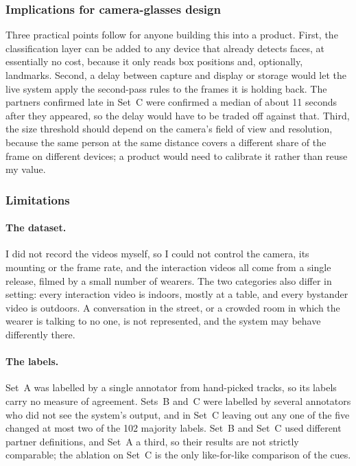 \subsubsection{Implications for camera-glasses design}

Three practical points follow for anyone building this into a product. First, the
classification layer can be added to any device that already detects faces, at essentially
no cost, because it only reads box positions and, optionally, landmarks. Second, a delay between capture and display or storage would let the live system apply
the second-pass rules to the frames it is holding back. The partners confirmed late in
Set~C were confirmed a median of about 11 seconds after they appeared, so the delay would
have to be traded off against that. Third, the size
threshold should depend on the camera's field of view and resolution, because the same
person at the same distance covers a different share of the frame on different devices; a
product would need to calibrate it rather than reuse my value.

\subsubsection{Limitations}
\label{sec:disc_limitations}

\paragraph{The dataset.}
I did not record the videos myself, so I could not control the camera, its mounting or
the frame rate, and the interaction videos all come from a single release, filmed by a
small number of wearers. The two categories also differ in setting: every interaction video is indoors, mostly at a table, and every
bystander video is outdoors. A conversation in the street, or a crowded room in which the
wearer is talking to no one, is not represented, and the system may behave differently
there.

\paragraph{The labels.}
Set~A was labelled by a single annotator from hand-picked tracks, so its labels carry no
measure of agreement. Sets~B and~C were labelled by several annotators who did not see the
system's output, and in Set~C leaving out any one of the five changed at most two of the
102 majority labels. Set~B and Set~C used
different partner definitions, and Set~A a third, so their results are not strictly
comparable; the ablation on Set~C is the only like-for-like comparison of the cues.

